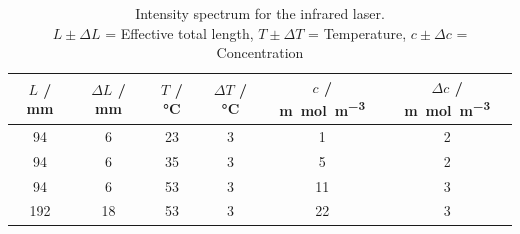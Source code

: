 \begin{table}[H]
    \centering
    \caption{Intensity spectrum for the infrared laser. \\
    $L \pm \Delta L$ = Effective total length, $T \pm \Delta T$ = Temperature, $c \pm \Delta c$ = Concentration}
    \label{tab:evaluation:concentration}
    \begin{tabular}{cccccc}
    \hline
    $L$ / mm & $\Delta L$ / mm & $T$ / \si{\celsius} & $\Delta T$ / \si{\celsius} & $c$ / \si{\m\mol\per\m^3} & $\Delta c$ / \si{\m\mol\per\m^3} \\ \hline
    94 & 6 & 23 & 3 & 1 & 2 \\
    94 & 6 & 35 & 3 & 5 & 2 \\
    94 & 6 & 53 & 3 & 11 & 3 \\
    192 & 18 & 53 & 3 & 22 & 3 \\ \hline
    \end{tabular}
\end{table}

\newpage